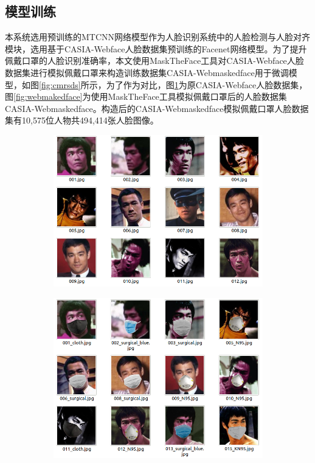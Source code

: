 \subsection{模型训练}

本系统选用预训练的MTCNN网络模型作为人脸识别系统中的人脸检测与人脸对齐模块，选用基于CASIA-Webface人脸数据集预训练的Facenet网络模型。为了提升佩戴口罩的人脸识别准确率，本文使用MaskTheFace工具对CASIA-Webface人脸数据集进行模拟佩戴口罩来构造训练数据集CASIA-Webmaskedface用于微调模型，如图\ref{fig:cmrsds}所示，为了作为对比，图\ref{fig:owebface}为原CASIA-Webface人脸数据集，图\ref{fig:webmakedface}为使用MaskTheFace工具模拟佩戴口罩后的人脸数据集CASIA-Webmaskedface。构造后的CASIA-Webmaskedface模拟佩戴口罩人脸数据集有10,575位人物共494,414张人脸图像。

\begin{figure}[H]
    \centering
    \begin{subfigure}{.45\textwidth}
        \centering
        \includegraphics[width=\textwidth]{figures/4webface.png}
        \label{fig:owebface}
    \end{subfigure}
    \qquad
    \begin{subfigure}{.45\textwidth}
        \centering
        \includegraphics[width=\textwidth]{figures/5webmaskedface.png}

\end{subfigure}
\end{figure}
